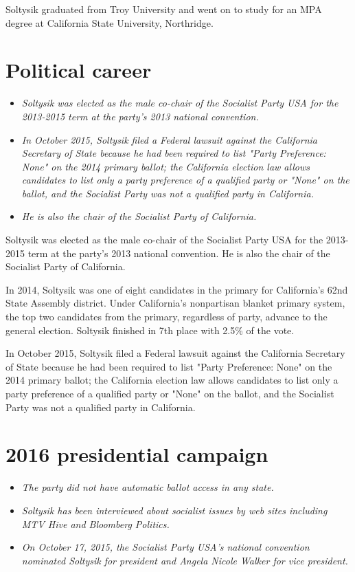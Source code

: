Soltysik graduated from Troy University and went on to study for an MPA
degree at California State University, Northridge.

\section{Political career}\label{political-career}

\begin{itemize}
\item
  \emph{Soltysik was elected as the male co-chair of the Socialist Party
  USA for the 2013-2015 term at the party's 2013 national convention.}
\item
  \emph{In October 2015, Soltysik filed a Federal lawsuit against the
  California Secretary of State because he had been required to list
  "Party Preference: None" on the 2014 primary ballot; the California
  election law allows candidates to list only a party preference of a
  qualified party or "None" on the ballot, and the Socialist Party was
  not a qualified party in California.}
\item
  \emph{He is also the chair of the Socialist Party of California.}
\end{itemize}

Soltysik was elected as the male co-chair of the Socialist Party USA for
the 2013-2015 term at the party's 2013 national convention. He is also
the chair of the Socialist Party of California.

In 2014, Soltysik was one of eight candidates in the primary for
California's 62nd State Assembly district. Under California's
nonpartisan blanket primary system, the top two candidates from the
primary, regardless of party, advance to the general election. Soltysik
finished in 7th place with 2.5\% of the vote.

In October 2015, Soltysik filed a Federal lawsuit against the California
Secretary of State because he had been required to list "Party
Preference: None" on the 2014 primary ballot; the California election
law allows candidates to list only a party preference of a qualified
party or "None" on the ballot, and the Socialist Party was not a
qualified party in California.

\section{2016 presidential campaign}\label{presidential-campaign}

\begin{itemize}
\item
  \emph{The party did not have automatic ballot access in any state.}
\item
  \emph{Soltysik has been interviewed about socialist issues by web
  sites including MTV Hive and Bloomberg Politics.}
\item
  \emph{On October 17, 2015, the Socialist Party USA's national
  convention nominated Soltysik for president and Angela Nicole Walker
  for vice president.}
\end{itemize}

